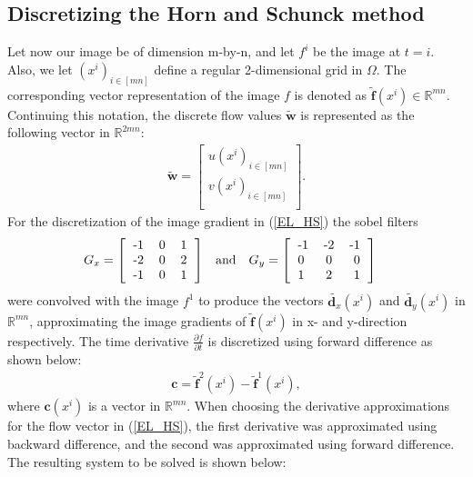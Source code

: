 \documentclass[10pt,a4paper]{article}
\begin{document}
\subsection{Discretizing the Horn and Schunck method}
Let now our image be of dimension m-by-n, and let $f^i$ be the image at $t=i$. Also, we let $(x^i)_ {i \in [mn]}$ define a regular 2-dimensional grid in $\Omega$. The corresponding vector representation of the image $f$ is denoted as $\tilde{\textbf{f}}(x^i) \in \mathbb{R}^{mn}$. Continuing this notation, the discrete flow values $\tilde{\textbf{w}}$ is represented as the following vector in $\mathbb{R}^{2mn}$:
\begin{align*}
     \tilde{\textbf{w}}=\begin{bmatrix}
         u(x^i)_{i\in [mn]}  \\
         v(x^i)_{i \in [mn]} \\
        \end{bmatrix}.
\end{align*}
For the discretization of the image gradient in (\ref{EL_HS}) the sobel filters
\begin{align*}
G_x =
\left[ 
\begin{tabular}{ l c r }
  -1 & 0 & 1 \\
  -2 & 0 & 2 \\
  -1 & 0 & 1 \\
\end{tabular}
\right] & &\text{and} & & 
G_y =
\left[ 
\begin{tabular}{ l c r }
  -1 & -2 & -1 \\
  0 & 0 & 0 \\
  1 & 2 & 1 \\
\end{tabular}
\right] &
\end{align*}
were convolved with the image $f^1$ to produce the vectors $\tilde{\textbf{d}_x}(x^i)$ and $\tilde{\textbf{d}_y}(x^i)$ in $\mathbb{R}^{mn}$, approximating the image gradients of $\tilde{\textbf{f}}(x^i)$ in x- and y-direction respectively. The time derivative $\frac{\partial f}{\partial t}$ is discretized using forward difference as shown below:
\begin{align*}
\textbf{c} = \tilde{\textbf{f}}^2(x^i) - \tilde{\textbf{f}}^1(x^i),
\end{align*} 
where $\textbf{c}(x^i)$ is a vector in $\mathbb{R}^{mn}$. When choosing the derivative approximations for the flow vector in (\ref{EL_HS}), the first derivative was approximated using backward difference, and the second was approximated using forward difference. The resulting system to be solved is shown below:
\end{document}

